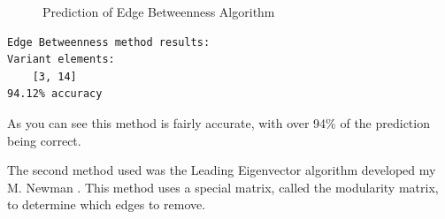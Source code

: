 \begin{figure}[h!]
\centering
{}
\caption{Prediction of Edge Betweenness Algorithm}
\label{fig:graph_eb}
\end{figure}

\begin{verbatim}
Edge Betweenness method results: 
Variant elements:
	[3, 14]
94.12% accuracy
\end{verbatim}

As you can see this method is fairly accurate, with over 94\% of the prediction being correct.

\clearpage

The second method used was the Leading Eigenvector algorithm developed my M. Newman \cite{new06}. This method uses a special matrix, called the modularity matrix, to determine which edges to remove.

